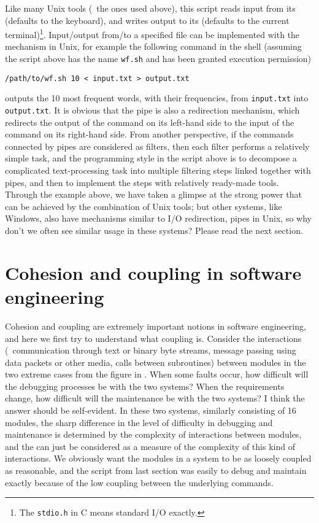 Like many Unix tools (\eg~the ones used above), this script reads input from
its  (defaults to the keyboard), and writes output to
its  (defaults to the current terminal)\footnote{The
\texttt{stdio.h} in C means standard I/O exactly.}.  Input/output from/to a
specified file can be implemented with the  mechanism
in Unix, for example the following command in the shell (assuming the script
above has the name \verb|wf.sh| and has been granted execution permission)
\begin{wquoting}
\begin{Verbatim}
/path/to/wf.sh 10 < input.txt > output.txt
\end{Verbatim}
\end{wquoting}
outputs the 10 most frequent words, with their frequencies, from
\verb|input.txt| into \verb|output.txt|.  It is obvious that the pipe is also
a redirection mechanism, which redirects the output of the command on its
left-hand side to the input of the command on its right-hand side.  From another
perspective, if the commands connected by pipes are considered as filters, then
each filter performs a relatively simple task, and the programming style in the
script above is to decompose a complicated text-processing task into multiple
filtering steps linked together with pipes, and then to implement the steps
with relatively ready-made tools.  Through the example above, we have taken a
glimpse at the strong power that can be achieved by the combination of Unix
tools; but other systems, like Windows, also have mechanisms similar to I/O
redirection, pipes \etc{} in Unix, so why don't we often see similar
usage in these systems?  Please read the next section.

\section{Cohesion and coupling in software engineering}\label{sec:coupling}

Cohesion and coupling are extremely important notions in software engineering,
and here we first try to understand what coupling is.  Consider the interactions
(\eg~communication through text or binary byte streams, message passing using
data packets or other media, calls between subroutines) between modules in
the two extreme cases from the figure in \parencite{litt2014a}.  When some
faults occur, how difficult will the debugging processes be with the two
systems?  When the requirements change, how difficult will the maintenance be
with the two systems?  I think the answer should be self-evident.  In these two
systems, similarly consisting of 16 modules, the sharp difference in the level
of difficulty in debugging and maintenance is determined by the complexity
of interactions between modules, and the  can just
be considered as a measure of the complexity of this kind of interactions.
We obviously want the modules in a system to be as loosely coupled as
reasonable, and the script from last section was easily to debug and
maintain exactly because of the low coupling between the underlying commands.

